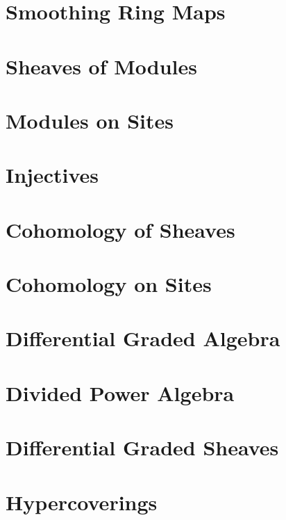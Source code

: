 \chapter{Smoothing Ring Maps}
\label{chap:smoothing}


\chapter{Sheaves of Modules}
\label{chap:modules}


\chapter{Modules on Sites}
\label{chap:sites-modules}


\chapter{Injectives}
\label{chap:injectives}


\chapter{Cohomology of Sheaves}
\label{chap:cohomology}


\chapter{Cohomology on Sites}
\label{chap:sites-cohomology}


\chapter{Differential Graded Algebra}
\label{chap:dga}


\chapter{Divided Power Algebra}
\label{chap:dpa}


\chapter{Differential Graded Sheaves}
\label{chap:sdga}


\chapter{Hypercoverings}
\label{chap:hypercovering}


